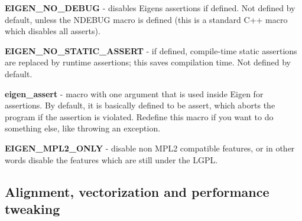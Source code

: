 \begin{DoxyItemize}
\item {\bfseries E\+I\+G\+E\+N\+\_\+\+N\+O\+\_\+\+D\+E\+B\+UG} -\/ disables Eigen\textquotesingle{}s assertions if defined. Not defined by default, unless the {\ttfamily N\+D\+E\+B\+UG} macro is defined (this is a standard C++ macro which disables all asserts).
\item {\bfseries E\+I\+G\+E\+N\+\_\+\+N\+O\+\_\+\+S\+T\+A\+T\+I\+C\+\_\+\+A\+S\+S\+E\+RT} -\/ if defined, compile-\/time static assertions are replaced by runtime assertions; this saves compilation time. Not defined by default.
\item {\bfseries eigen\+\_\+assert} -\/ macro with one argument that is used inside Eigen for assertions. By default, it is basically defined to be {\ttfamily assert}, which aborts the program if the assertion is violated. Redefine this macro if you want to do something else, like throwing an exception.
\item {\bfseries E\+I\+G\+E\+N\+\_\+\+M\+P\+L2\+\_\+\+O\+N\+LY} -\/ disable non M\+P\+L2 compatible features, or in other words disable the features which are still under the L\+G\+PL.
\end{DoxyItemize}\hypertarget{_topic_preprocessor_directives_TopicPreprocessorDirectivesPerformance}{}\subsection{Alignment, vectorization and performance tweaking}\label{_topic_preprocessor_directives_TopicPreprocessorDirectivesPerformance}

